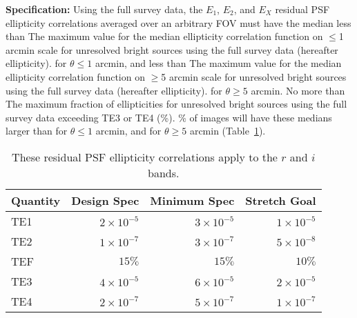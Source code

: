 \textbf{Specification:} Using the full survey data, the $E_1$, $E_2$, and
$E_X$ residual PSF ellipticity correlations
averaged over an arbitrary FOV must have the median less than
{The maximum value for the median ellipticity correlation function
on $\le$1 arcmin scale for unresolved bright sources using the full survey data
(hereafter ellipticity).}
for $\theta \le 1$ arcmin, and less than
{The maximum value for the median ellipticity correlation function
on $\ge$5 arcmin scale for unresolved bright sources using the full survey data
(hereafter ellipticity).}
for $\theta \ge 5$ arcmin. No more than
{The maximum fraction of ellipticities for unresolved bright sources using the
full survey data exceeding TE3 or TE4 (\%).}
\% of images will have these medians larger than
for $\theta \le 1$ arcmin, and
for $\theta \ge 5$ arcmin (Table~\ref{fullEllip}).

\begin{table}[h]
\begin{tabular}{|l|r|r|r|}
\hline
Quantity       &   Design Spec & Minimum Spec  & Stretch Goal \\
\hline
      TE1 & $2 \times 10^{-5}$  & $3 \times 10^{-5}$ & $1 \times 10^{-5}$ \\
      TE2 & $1 \times 10^{-7}$  & $3 \times 10^{-7}$ & $5 \times 10^{-8}$ \\
      TEF & $15\%$              & $15\%$             & $10\%$             \\
      TE3 & $4 \times 10^{-5}$  & $6 \times 10^{-5}$ & $2 \times 10^{-5}$ \\
      TE4 & $2 \times 10^{-7}$  & $5 \times 10^{-7}$ & $1 \times 10^{-7}$ \\
\hline
\end{tabular}
\caption{These residual PSF ellipticity correlations apply to the $r$ and $i$ bands.}
\label{fullEllip}
\end{table}

